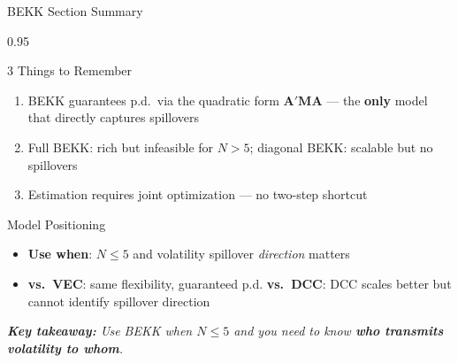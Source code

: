 \documentclass[9pt, aspectratio=169, t]{beamer}
\begin{document}
\begin{frame}{BEKK Section Summary}
    \begin{cminipage}{0.95\textwidth}
    {\footnotesize
    \begin{block}{3 Things to Remember}
        \begin{enumerate}\setlength{\itemsep}{2pt}
            \item BEKK guarantees p.d.\ via the quadratic form $\mathbf{A}'\mathbf{M}\mathbf{A}$ --- the \textbf{only} model that directly captures spillovers
            \item Full BEKK: rich but infeasible for $N > 5$; diagonal BEKK: scalable but no spillovers
            \item Estimation requires joint optimization --- no two-step shortcut
        \end{enumerate}
    \end{block}
    \begin{alertblock}{Model Positioning}
        \begin{itemize}\setlength{\itemsep}{0pt}
            \item \textbf{Use when}: $N \leq 5$ and volatility spillover \textit{direction} matters
            \item \textbf{vs.\ VEC}: same flexibility, guaranteed p.d. \quad \textbf{vs.\ DCC}: DCC scales better but cannot identify spillover direction
        \end{itemize}
    \end{alertblock}
    \vspace{1mm}
    \textit{\textbf{Key takeaway:} Use BEKK when $N \leq 5$ and you need to know \textbf{who transmits volatility to whom}.}
    }
    \end{cminipage}
\end{frame}

\end{document}
